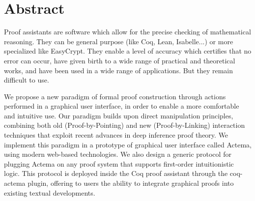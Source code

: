 \dedication{
	The ultimate meaning of logic is this ability to manipulate.
	\flushright -- Jean-Yves Girard.
	\small
	TODO: Move this as the epigraph of some chapter (either Introduction or
	Proof-by-Action)
}



\maketitle


\chapter*{Abstract}

Proof assistants are software which allow for the precise checking of
mathematical reasoning. They can be general purpose (like Coq, Lean,
Isabelle...) or more specialized like EasyCrypt. They enable a level of accuracy
which certifies that no error can occur, have given birth to a wide range of
practical and theoretical works, and have been used in a wide range of
applications. But they remain difficult to use.

We propose a new paradigm of formal proof construction through actions performed
in a graphical user interface, in order to enable a more comfortable and
intuitive use. Our paradigm builds upon direct manipulation principles,
combining both old (Proof-by-Pointing) and new (Proof-by-Linking) interaction
techniques that exploit recent advances in deep inference proof theory. We
implement this paradigm in a prototype of graphical user interface called
Actema, using modern web-based technologies. We also design a generic protocol
for plugging Actema on any proof system that supports first-order intuitionistic
logic. This protocol is deployed inside the Coq proof assistant through the
coq-actema plugin, offering to users the ability to integrate graphical proofs
into existing textual developments.

